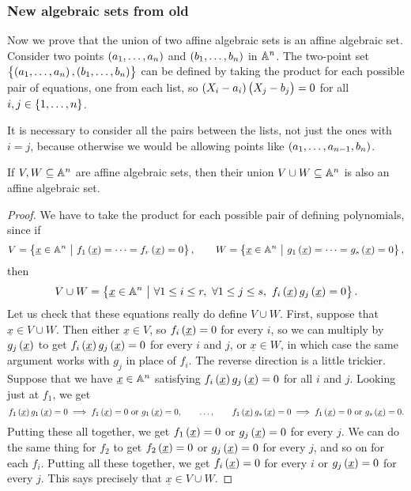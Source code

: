\subsubsection{New algebraic sets from old}

Now we prove that the union of two affine algebraic sets is an affine algebraic set. Consider two points $ \br{a_1, \dots, a_n} $ and $ \br{b_1, \dots, b_n} $ in $ \AA^n $. The two-point set $ \cbr{\br{a_1, \dots, a_n}, \br{b_1, \dots, b_n}} $ can be defined by taking the product for each possible pair of equations, one from each list, so $ \br{X_i - a_i}\br{X_j - b_j} = 0 $ for all $ i, j \in \cbr{1, \dots, n} $.

\begin{note*}
It is necessary to consider all the pairs between the lists, not just the ones with $ i = j $, because otherwise we would be allowing points like $ \br{a_1, \dots, a_{n - 1}, b_n} $.
\end{note*}

\begin{lemma}
If $ V, W \subseteq \AA^n $ are affine algebraic sets, then their union $ V \cup W \subseteq \AA^n $ is also an affine algebraic set.
\end{lemma}

\begin{proof}
We have to take the product for each possible pair of defining polynomials, since if
$$ V = \cbr{\underline{x} \in \AA^n \st f_1\br{\underline{x}} = \dots = f_r\br{\underline{x}} = 0}, \qquad W = \cbr{\underline{x} \in \AA^n \st g_1\br{\underline{x}} = \dots = g_s\br{\underline{x}} = 0}, $$
then
$$ V \cup W = \cbr{\underline{x} \in \AA^n \st \forall 1 \le i \le r, \ \forall 1 \le j \le s, \ f_i\br{\underline{x}}g_j\br{\underline{x}} = 0}. $$
Let us check that these equations really do define $ V \cup W $. First, suppose that $ \underline{x} \in V \cup W $. Then either $ \underline{x} \in V $, so $ f_i\br{\underline{x}} = 0 $ for every $ i $, so we can multiply by $ g_j\br{\underline{x}} $ to get $ f_i\br{\underline{x}}g_j\br{\underline{x}} = 0 $ for every $ i $ and $ j $, or $ \underline{x} \in W $, in which case the same argument works with $ g_j $ in place of $ f_i $. The reverse direction is a little trickier. Suppose that we have $ \underline{x} \in \AA^n $ satisfying $ f_i\br{\underline{x}}g_j\br{\underline{x}} = 0 $ for all $ i $ and $ j $. Looking just at $ f_1 $, we get
$$ f_1\br{\underline{x}}g_1\br{\underline{x}} = 0 \implies f_1\br{\underline{x}} = 0 \ \text{or} \ g_1\br{\underline{x}} = 0, \qquad \dots, \qquad f_1\br{\underline{x}}g_s\br{\underline{x}} = 0 \implies f_1\br{\underline{x}} = 0 \ \text{or} \ g_s\br{\underline{x}} = 0. $$
Putting these all together, we get $ f_1\br{\underline{x}} = 0 $ or $ g_j\br{\underline{x}} = 0 $ for every $ j $. We can do the same thing for $ f_2 $ to get $ f_2\br{\underline{x}} = 0 $ or $ g_j\br{\underline{x}} = 0 $ for every $ j $, and so on for each $ f_i $. Putting all these together, we get $ f_i\br{\underline{x}} = 0 $ for every $ i $ or $ g_j\br{\underline{x}} = 0 $ for every $ j $. This says precisely that $ \underline{x} \in V \cup W $.
\end{proof}

